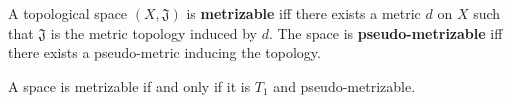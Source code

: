 A topological space $(X, \mathfrak{J})$ is \textbf{metrizable} iff there exists a metric $d$ on $X$ such that $\mathfrak{J}$ is the metric topology induced by $d$. The space is \textbf{pseudo-metrizable} iff there exists a pseudo-metric inducing the topology.

A space is metrizable if and only if it is $T_1$ and pseudo-metrizable.
